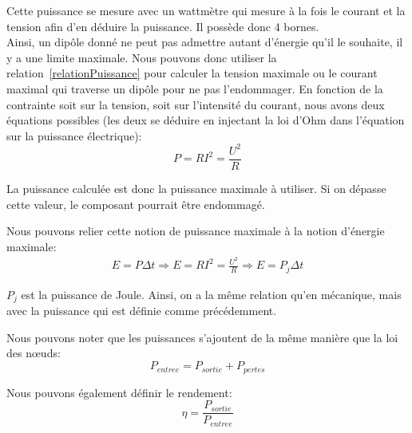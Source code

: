 \documentclass[11pt,a4paper,openany]{book}
\begin{document}
Cette puissance se mesure avec un wattmètre qui mesure à la fois le courant et la tension afin d'en déduire la puissance. Il possède donc 4 bornes.\\
Ainsi, un dipôle donné ne peut pas admettre autant d'énergie qu'il le souhaite, il y a une limite maximale. Nous pouvons donc utiliser la relation~\ref{relationPuissance} pour calculer la tension maximale ou le courant maximal qui traverse un dipôle pour ne pas l'endommager. En fonction de la contrainte soit sur la tension, soit sur l'intensité du courant, nous avons deux équations possibles (les deux se déduire en injectant la loi d'Ohm dans l'équation sur la puissance électrique):
\begin{equation}
P = RI^{2} = \frac{U^{2}}{R}
\end{equation}

La puissance calculée est donc la puissance maximale à utiliser. Si on dépasse cette valeur, le composant pourrait être endommagé.

\newpage

Nous pouvons relier cette notion de puissance maximale à la notion d'énergie maximale:
\begin{align}
E = P\Delta t \Rightarrow E = RI^{2} = \frac{U^{2}}{R} \Rightarrow E = P_{j}\Delta t
\end{align}

$ P_{j} $ est la puissance de Joule. Ainsi, on a la même relation qu'en mécanique, mais avec la puissance qui est définie comme précédemment.

\begin{figure}[!h]
\begin{center}
\end{center}
\end{figure}

Nous pouvons noter que les puissances s'ajoutent de la même manière que la loi des nœuds:
\begin{equation}
P_{entree} = P_{sortie} + P_{pertes}
\end{equation}

Nous pouvons également définir le rendement:
\begin{equation}
\eta = \frac{P_{sortie}}{P_{entree}}
\end{equation}
\end{document}
